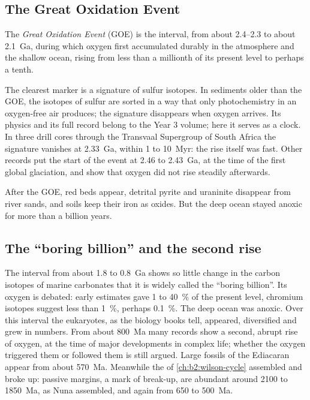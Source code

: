 \subsection*{The Great Oxidation Event}

\begin{definition}\label{def:b2:precambrian-earth:goe}
The \emph{Great Oxidation Event} (GOE) is the interval, from about
2.4--2.3 to about \qty{2.1}{Ga}, during which oxygen first accumulated durably in the
atmosphere and the shallow ocean, rising from less than a millionth of its present level to
perhaps a tenth.
\end{definition}

The clearest marker is a signature of sulfur isotopes. In sediments older than the GOE, the
isotopes of sulfur are sorted in a way that only photochemistry in an oxygen-free air
produces; the signature disappears when oxygen arrives. Its physics and its full record belong
to the Year 3 volume; here it serves as a clock. In three drill cores through the Transvaal
Supergroup of South Africa the signature vanishes at \qty{2.33}{Ga}, within 1 to \qty{10}{Myr}:
the rise itself was fast. Other records put the start of the event at 2.46 to \qty{2.43}{Ga},
at the time of the first global glaciation, and show that oxygen did not rise steadily
afterwards.

After the GOE, red beds appear, detrital pyrite and uraninite disappear from river sands,
and soils keep their iron as oxides. But the deep ocean stayed anoxic for more than a billion
years.

\subsection*{The ``boring billion'' and the second rise}

The interval from about 1.8 to \qty{0.8}{Ga} shows so little change in the carbon isotopes of
marine carbonates that it is widely called the ``boring billion''. Its oxygen is debated: early
estimates gave 1 to \qty{40}{\percent} of the present level, chromium isotopes suggest less than
\qty{1}{\percent}, perhaps \qty{0.1}{\percent}. The deep ocean was anoxic. Over this interval
the eukaryotes, as the biology books tell, appeared, diversified and grew in numbers. From about \qty{800}{Ma} many records show
a second, abrupt rise of oxygen, at the time of major developments in complex life; whether
the oxygen triggered them or followed them is still argued. Large fossils of the Ediacaran
appear from about \qty{570}{Ma}. Meanwhile the  of \cref{ch:b2:wilson-cycle}
assembled and broke up: passive margins, a mark of break-up, are abundant around 2100 to
\qty{1850}{Ma}, as Nuna assembled, and again from 650 to \qty{500}{Ma}.

